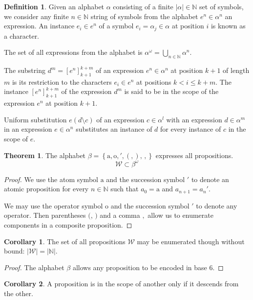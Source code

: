\documentclass{amsbook}
\newcommand{\setsm}[1]{\left\{#1\right\}}
\newcommand{\wffs}{\mathcal W}
\theoremstyle{definition}
\newtheorem{thm}{Theorem}[section]
\newtheorem{crl}{Corollary}[section]
\newtheorem{dfn}{Definition}[section]
\begin{document}
\begin{dfn}
    Given an alphabet $\alpha$ consisting of a finite $|\alpha| \in \mathbb N$ set of symbols, we consider any finite $n \in \mathbb N$ string of symbols from the alphabet $e^n \in \alpha^n$ an expression. An instance $e_i \in e^n$ of a symbol $e_i = \alpha_j \in \alpha$ at position $i$ is known as a character.

    The set of all expressions from the alphabet is $\alpha^\omega = \bigcup_{n \in \mathbb N} \alpha^n$.

    The substring $d^m = \left[ e^n \right]_{k+1}^{k+m}$ of an expression $e^n \in \alpha^n$ at position $k + 1$ of length $m$ is its restriction to the characters $e_i \in e^n$ at positions $k < i \leq k+m$. The instance $\left[ e^n \right]_{k+1}^{k+m}$ of the expression $d^m$ is said to be in the scope of the expression $e^n$ at position $k+1$.

    Uniform substitution $e(d \setminus c)$ of an expression $c \in \alpha^l$ with an expression $d \in \alpha^m$ in an expression $e \in \alpha^n$ substitutes an instance of $d$ for every instance of $c$ in the scope of $e$.
\end{dfn}

\begin{thm}
    The alphabet $\beta = \setsm{\mathrm a, \mathrm o, ', (, ),\,,}$ expresses all propositions.
    $$ \wffs \subset \beta^\omega $$
    \begin{proof}
        We use the atom symbol $\mathrm a$ and the succession symbol $'$ to denote an atomic proposition for every $n \in \mathbb N$ such that $a_0 = \mathrm a$ and $a_{n+1} = a_n'$.

        We may use the operator symbol $\mathrm o$ and the succession symbol $'$ to denote any operator. Then parentheses $($, $)$ and a comma $,$ allow us to enumerate components in a composite proposition.
    \end{proof}
\end{thm}

\begin{crl}
    The set of all propositions $\mathcal W$ may be enumerated though without bound: $|\wffs| = |\mathbb N|$.
    \begin{proof}
        The alphabet $\beta$ allows any proposition to be encoded in base $6$.
    \end{proof}
\end{crl}

\begin{crl}
    A proposition is in the scope of another only if it descends from the other.
\end{crl}
\end{document}
